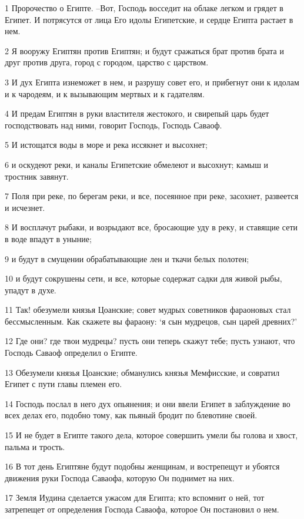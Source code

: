 \par 1 Пророчество о Египте. --Вот, Господь восседит на облаке легком и грядет в Египет. И потрясутся от лица Его идолы Египетские, и сердце Египта растает в нем.
\par 2 Я вооружу Египтян против Египтян; и будут сражаться брат против брата и друг против друга, город с городом, царство с царством.
\par 3 И дух Египта изнеможет в нем, и разрушу совет его, и прибегнут они к идолам и к чародеям, и к вызывающим мертвых и к гадателям.
\par 4 И предам Египтян в руки властителя жестокого, и свирепый царь будет господствовать над ними, говорит Господь, Господь Саваоф.
\par 5 И истощатся воды в море и река иссякнет и высохнет;
\par 6 и оскудеют реки, и каналы Египетские обмелеют и высохнут; камыш и тростник завянут.
\par 7 Поля при реке, по берегам реки, и все, посеянное при реке, засохнет, развеется и исчезнет.
\par 8 И восплачут рыбаки, и возрыдают все, бросающие уду в реку, и ставящие сети в воде впадут в уныние;
\par 9 и будут в смущении обрабатывающие лен и ткачи белых полотен;
\par 10 и будут сокрушены сети, и все, которые содержат садки для живой рыбы, упадут в духе.
\par 11 Так! обезумели князья Цоанские; совет мудрых советников фараоновых стал бессмысленным. Как скажете вы фараону: `я сын мудрецов, сын царей древних?'
\par 12 Где они? где твои мудрецы? пусть они теперь скажут тебе; пусть узнают, что Господь Саваоф определил о Египте.
\par 13 Обезумели князья Цоанские; обманулись князья Мемфисские, и совратил Египет с пути главы племен его.
\par 14 Господь послал в него дух опьянения; и они ввели Египет в заблуждение во всех делах его, подобно тому, как пьяный бродит по блевотине своей.
\par 15 И не будет в Египте такого дела, которое совершить умели бы голова и хвост, пальма и трость.
\par 16 В тот день Египтяне будут подобны женщинам, и вострепещут и убоятся движения руки Господа Саваофа, которую Он поднимет на них.
\par 17 Земля Иудина сделается ужасом для Египта; кто вспомнит о ней, тот затрепещет от определения Господа Саваофа, которое Он постановил о нем.
